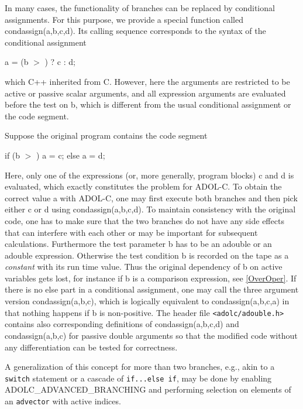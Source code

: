 \documentclass[11pt,twoside]{article}
\begin{document}
In many cases, the functionality of branches 
can be replaced by conditional assignments.  
For this purpose, we provide a special function called
{\sf condassign(a,b,c,d)}. Its calling sequence corresponds to the 
syntax of the conditional assignment
\begin{center}
    {\sf a = (b \boldmath $>$ ) ? c : d;}  
\end{center}
which C++ inherited from C. However, here the arguments are restricted to be
active or passive scalar arguments, and all expression arguments
are evaluated before the test on {\sf  b}, which is different from
the usual conditional assignment or the code segment.

Suppose the original program contains the code segment
\begin{center}
{\sf if (b \boldmath $>$ ) a = c; else a = d;}\\
\end{center}
Here, only one of the expressions (or, more generally, program blocks)
{\sf c} and {\sf d} is evaluated, which exactly constitutes the problem
for ADOL-C. To obtain the correct value {\sf a} with ADOL-C, one
may first execute both branches and then pick either {\sf c}
or {\sf d} using 
{\sf condassign(a,b,c,d)}. To maintain
consistency with the original code, one has to make sure
that the two branches do not have any side effects that can
interfere with each other or may be important for subsequent
calculations. Furthermore the test parameter {\sf b} has to be an 
{\sf adouble} or an {\sf adouble} expression. Otherwise the 
test condition {\sf b} is recorded on the tape as a {\em constant} with its
run time value. Thus the original dependency of {\sf b} on 
active variables gets lost, for instance if {\sf b} is a comparison 
expression, see \autoref{OverOper}. 
If there is no {\sf else} part in a conditional assignment, one may call
the three argument version 
{\sf condassign(a,b,c)}, which 
is logically equivalent to {\sf condassign(a,b,c,a)} in that
nothing happens if {\sf b} is non-positive.  
The header file \verb=<adolc/adouble.h>=
contains also corresponding definitions of
{\sf condassign(a,b,c,d)} 
and {\sf condassign(a,b,c)} for
passive {\sf double} arguments so that the modified code 
without any differentiation can be tested
for correctness. 

A generalization of this concept for more than two branches, e.g.,
akin to a \texttt{switch} statement or a cascade of \texttt{if...else if}, may be done by enabling
\textsf{ADOLC\_ADVANCED\_BRANCHING} and performing selection on
elements of an \texttt{advector} with active indices.
%
\end{document}
